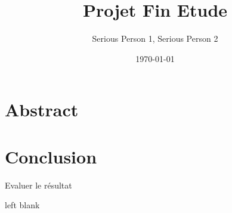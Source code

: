 \documentclass[a4paper, 12pt]{report}
\title{Projet Fin Etude}
\author{Serious Person 1, Serious Person 2}
\date{\today}
\begin{document}
	
\maketitle

\pagestyle{fancy}	

\chapter*{Abstract} 

\pagestyle{plain}	

\tableofcontents
	
	




\chapter{Conclusion}
Evaluer le résultat 

\newpage
left blank
\newpage
\listoffigures
\printbibliography
\end{document}
